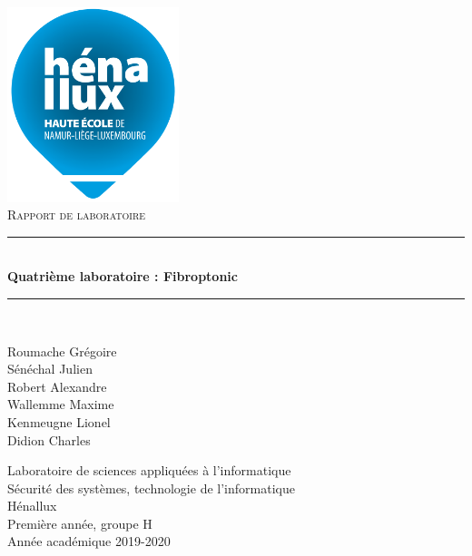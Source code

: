 \documentclass[a4paper]{article}
\newcommand{\HRule}{\rule{\linewidth}{0.5mm}}
\newcommand{\bgimg}[1]{
\AddToShipoutPicture
   {
      \put(\LenToUnit{0 cm},\LenToUnit{0 cm})
      {
            \texttt{[image: \#1]} 
      }
   }
}
\begin{document}

















\begin{titlepage}
    \begin{sffamily}
        \begin{center}
            \includegraphics[width=5cm]{images/LogoHenallux.PNG}~\\[1.5cm]
            \textsc{\Large Rapport de laboratoire}\\[1.5cm]

            \HRule \\[0.4cm]
            { \huge \bfseries Quatrième laboratoire : Fibroptonic\\[0.4cm] }
            \HRule \\[2cm]

            \begin{minipage}{0.4\textwidth}
                \begin{flushleft} \large
                    Roumache Grégoire\\
                    Sénéchal Julien\\
                    Robert Alexandre\\
                    Wallemme Maxime\\
                    Kenmeugne Lionel\\
                    Didion Charles
                \end{flushleft}
            \end{minipage}
            \begin{minipage}{0.55\textwidth}
                \begin{flushright} \large
                    Laboratoire de sciences appliquées à l'informatique\\
                    Sécurité des systèmes, technologie de l'informatique\\
                    Hénallux\\
                    Première année, groupe H \\
                    Année académique 2019-2020\\
                \end{flushright}
            \end{minipage}
            \vfill


\end{center}
\end{sffamily}
\end{titlepage}
\end{document}
